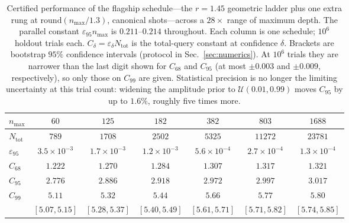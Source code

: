 \documentclass[%
 twocolumn,
 amsmath,amssymb,
prx,
longbibliography
]{revtex4-2}
\newcommand{\Ntot}{N_{\mathrm{tot}}}
\begin{document}
\begin{table}[t]
\caption{\label{tab:scale}Certified performance of the flagship schedule---the $r=1.45$ geometric ladder plus one extra rung at $\mathrm{round}(n_{\max}/1.3)$, canonical shots---across a $28\times$ range of maximum depth. The parallel constant $\varepsilon_{95}n_{\max}$ is $0.211$--$0.214$ throughout. Each column is one schedule; $10^6$ holdout trials each. $C_\delta = \varepsilon_\delta \Ntot$ is the total-query constant at confidence $\delta$. Brackets are bootstrap $95\%$ confidence intervals (protocol in Sec.~\ref{sec:numerics}). At $10^6$ trials they are narrower than the last digit shown for $C_{68}$ and $C_{95}$ (at most $\pm 0.003$ and $\pm 0.009$, respectively), so only those on $C_{99}$ are given. Statistical precision is no longer the limiting uncertainty at this trial count: widening the amplitude prior to $\mathcal{U}(0.01, 0.99)$ moves $C_{95}$ by up to $1.6\%$, roughly five times more.}
\begin{ruledtabular}
\begin{tabular}{lcccccc}
$n_{\max}$ & $60$ & $125$ & $182$ & $382$ & $803$ & $1688$ \\
\hline
$\Ntot$ & $789$ & $1708$ & $2502$ & $5325$ & $11272$ & $23781$ \\
$\varepsilon_{95}$ & $3.5\times 10^{-3}$ & $1.7\times 10^{-3}$ & $1.2\times 10^{-3}$ & $5.6\times 10^{-4}$ & $2.7\times 10^{-4}$ & $1.3\times 10^{-4}$ \\
$C_{68}$ & $1.222$ & $1.270$ & $1.284$ & $1.307$ & $1.317$ & $1.321$ \\
$C_{95}$ & $2.776$ & $2.886$ & $2.918$ & $2.972$ & $2.997$ & $3.017$ \\
$C_{99}$ & $5.11$ & $5.32$ & $5.44$ & $5.66$ & $5.77$ & $5.80$ \\
         & $[5.07, 5.15]$ & $[5.28, 5.37]$ & $[5.40, 5.49]$ & $[5.61, 5.71]$ & $[5.71, 5.82]$ & $[5.74, 5.85]$ \\
\end{tabular}
\end{ruledtabular}
\end{table}
\end{document}
